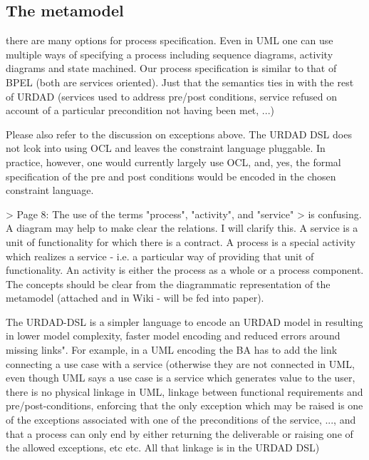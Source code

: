 \subsection{The metamodel}








there are many options for process specification. Even in UML one can use multiple ways of specifying a process including sequence diagrams, activity diagrams and state machined. Our process specification is similar to that of BPEL (both are services oriented). Just that the semantics ties in with the rest of URDAD (services used to address pre/post conditions, service refused on account of a particular precondition not having been met, ...)

Please also refer to the discussion on exceptions above. The URDAD DSL does not lcok into using OCL and leaves the constraint language pluggable. In practice, however, one would currently largely use OCL, and, yes, the formal specification of the pre and post conditions would be encoded in the chosen constraint language.

> Page 8: The use of the terms "process", "activity", and "service"
> is confusing. A diagram may help to make clear the relations.
I will clarify this. A service is a unit of functionality for which there is a contract. A process is a special activity which realizes a service - i.e. a particular way of providing that unit of functionality. An activity is either the process as a whole or a process component. The concepts should be clear from the diagrammatic representation of the metamodel (attached and in Wiki - will be fed into paper).

The URDAD-DSL is a simpler language to encode an URDAD model in resulting in lower model complexity, faster model encoding and reduced errors around missing links". For example, in a UML encoding the BA has to add the link connecting a use case with a service (otherwise they are not connected in UML, even though UML says a use case is a service which generates value to the user, there is no physical linkage in UML, linkage between functional requirements and pre/post-conditions, enforcing that the only exception which may be raised is one of the exceptions associated with one of the preconditions of the service, ..., and that a process can only end by either returning the deliverable or raising one of the allowed exceptions, etc etc. All that linkage is in the URDAD DSL)





